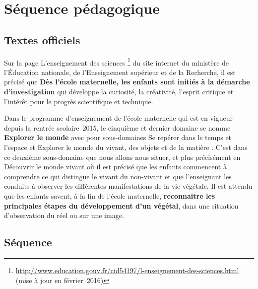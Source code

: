 \section{Séquence pédagogique}
\subsection{Textes officiels}
Sur la page \og L’enseignement des sciences \fg{}\footnote{\url{http://www.education.gouv.fr/cid54197/l-enseignement-des-sciences.html} (mise à jour en février~2016)} du site internet du ministère de l’Éducation nationale, de l’Enseignement supérieur et de la Recherche, il est précisé que \og \textbf{Dès l’école maternelle, les enfants sont initiés à la démarche d’investigation} qui développe la curiosité, la créativité, l’esprit critique et l’intérêt pour le progrès scientifique et technique. \fg{}

Dans le programme d’enseignement de l’école maternelle \cite{BO2015} qui est en vigueur depuis la rentrée scolaire~2015, le cinquième et dernier domaine se nomme \og \textbf{Explorer le monde} \fg{} avec pour sous-domaines \og Se repérer dans le temps et l’espace \fg{} et \og Explorer le monde du vivant, des objets et de la matière \fg{}. C’est dans ce deuxième sous-domaine que nous allons nous situer, et plus précisément en \og Découvrir le monde vivant \fg{} où il est précisé que les enfants commencent à comprendre ce qui distingue le vivant du non-vivant et que l’enseignant les conduits à observer les différentes manifestations de la vie végétale. Il est attendu que les enfants savent, à la fin de l’école maternelle, \textbf{reconnaitre les principales étapes du développement d’un végétal}, dans une situation d’observation du réel ou sur une image.

\subsection{Séquence}

\makeatletter
\ifx\NbSeancestocke\@undefined\relax\else\setcounter{NbSeance}{\NbSeancestocke}\fi
\ifx\DureeTotalestockee\@undefined\relax\else\setcounter{DureeTotale}{\DureeTotalestockee}\fi
\makeatother

%

